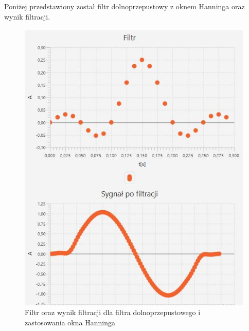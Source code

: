 \documentclass[12pt]{article}
\begin{document}
Poniżej przedstawiony został filtr dolnoprzepustowy z oknem Hanninga oraz wynik filtracji.
\begin{figure}[H]
	\centering
	\includegraphics[width=\linewidth]{filtr-dolnoprzep-hannin}
	\caption{Filtr oraz wynik filtracji dla filtra dolnoprzepustowego i zastosowania okna Hanninga}
	\label{}
\end{figure}
\end{document}
